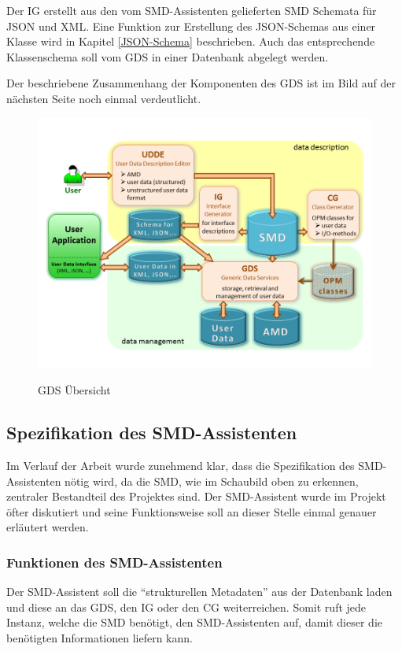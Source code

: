 Der \ac{IG} erstellt aus den vom SMD-Assistenten gelieferten \ac{SMD} Schemata f\"ur \ac{JSON} und XML. Eine Funktion zur Erstellung des \ac{JSON}-Schemas aus einer Klasse wird in Kapitel \ref{JSON-Schema} beschrieben.
Auch das entsprechende Klassenschema soll vom \ac{GDS} in einer Datenbank abgelegt werden.

Der beschriebene Zusammenhang der Komponenten des \ac{GDS} ist im Bild auf der n\"achsten Seite noch einmal verdeutlicht.

\begin{figure}[!ht]
\centering
\includegraphics[width=13.5cm]{Bilder/UebersichtGDS}
\label{GDS \"Ubersicht}
\caption{GDS \"Ubersicht}
\centering
\end{figure}

\FloatBarrier

\subsection{Spezifikation des SMD-Assistenten}
Im Verlauf der Arbeit wurde zunehmend klar, dass die Spezifikation des SMD-Assistenten n\"otig wird, da die \ac{SMD}, wie im Schaubild oben zu erkennen, zentraler Bestandteil des Projektes sind.
Der SMD-Assistent wurde im Projekt \"ofter diskutiert und seine Funktionsweise soll an dieser Stelle einmal genauer erl\"autert werden.

\subsubsection{Funktionen des SMD-Assistenten}
Der SMD-Assistent soll die "`strukturellen Metadaten"' aus der Datenbank laden und diese an das \ac{GDS}, den \ac{IG} oder den \ac{CG} weiterreichen. Somit ruft jede Instanz, welche die \ac{SMD} ben\"otigt, den \ac{SMD}-Assistenten auf, damit dieser die ben\"otigten Informationen liefern kann.


